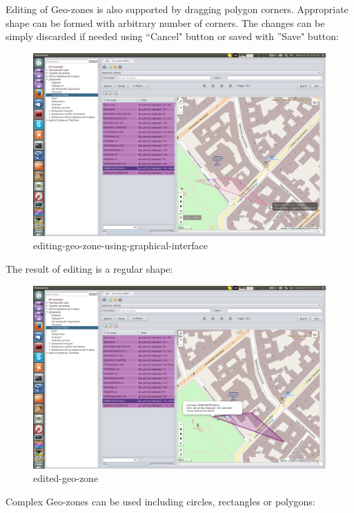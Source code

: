 Editing of Geo-zones is also supported by dragging polygon corners. Appropriate shape can be formed with 
arbitrary number of corners. The changes can be simply discarded if needed using ``Cancel" button or saved 
with ''Save" button:
\begin{figure}[!htp]
\centering
\includegraphics[width=16cm]{chapters/01-geozones/images/05-editing-geo-zone-using-graphical-interface.png}
\caption{editing-geo-zone-using-graphical-interface}\label{fig:05}
\end{figure}
The result of editing is a regular shape:
\begin{figure}[!htp]
\centering
\includegraphics[width=16cm]{chapters/01-geozones/images/06-edited-geo-zone.png}
\caption{edited-geo-zone}\label{fig:06}
\end{figure}
Complex Geo-zones can be used including circles, rectangles or polygons:
